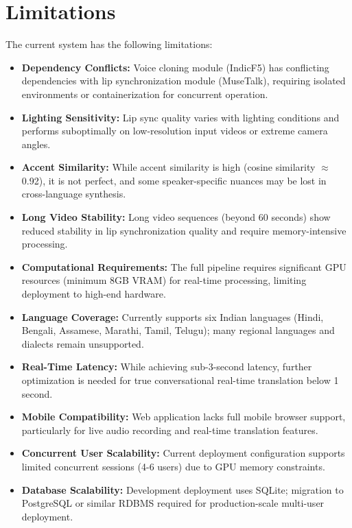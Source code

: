 \documentclass[12pt,oneside]{report}
\begin{document}
\section{Limitations}

The current system has the following limitations:

\begin{itemize}
    \item \textbf{Dependency Conflicts:} Voice cloning module (IndicF5) has conflicting dependencies with lip synchronization module (MuseTalk), requiring isolated environments or containerization for concurrent operation.
    
    \item \textbf{Lighting Sensitivity:} Lip sync quality varies with lighting conditions and performs suboptimally on low-resolution input videos or extreme camera angles.
    
    \item \textbf{Accent Similarity:} While accent similarity is high (cosine similarity $\approx$ 0.92), it is not perfect, and some speaker-specific nuances may be lost in cross-language synthesis.
    
    \item \textbf{Long Video Stability:} Long video sequences (beyond 60 seconds) show reduced stability in lip synchronization quality and require memory-intensive processing.
    
    \item \textbf{Computational Requirements:} The full pipeline requires significant GPU resources (minimum 8GB VRAM) for real-time processing, limiting deployment to high-end hardware.
    
    \item \textbf{Language Coverage:} Currently supports six Indian languages (Hindi, Bengali, Assamese, Marathi, Tamil, Telugu); many regional languages and dialects remain unsupported.
    
    \item \textbf{Real-Time Latency:} While achieving sub-3-second latency, further optimization is needed for true conversational real-time translation below 1 second.
    
    \item \textbf{Mobile Compatibility:} Web application lacks full mobile browser support, particularly for live audio recording and real-time translation features.
    
    \item \textbf{Concurrent User Scalability:} Current deployment configuration supports limited concurrent sessions (4-6 users) due to GPU memory constraints.
    
    \item \textbf{Database Scalability:} Development deployment uses SQLite; migration to PostgreSQL or similar RDBMS required for production-scale multi-user deployment.
\end{itemize}
\end{document}
